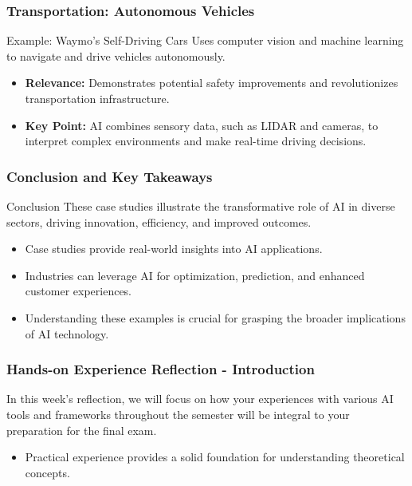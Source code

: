\documentclass{beamer}
\begin{document}
\begin{frame}[fragile]
    \frametitle{Transportation: Autonomous Vehicles}
    \begin{block}{Example: Waymo's Self-Driving Cars}
        Uses computer vision and machine learning to navigate and drive vehicles autonomously.
    \end{block}
    \begin{itemize}
        \item \textbf{Relevance:} Demonstrates potential safety improvements and revolutionizes transportation infrastructure.
        \item \textbf{Key Point:} AI combines sensory data, such as LIDAR and cameras, to interpret complex environments and make real-time driving decisions.
    \end{itemize}
\end{frame}

\begin{frame}[fragile]
    \frametitle{Conclusion and Key Takeaways}
    \begin{block}{Conclusion}
        These case studies illustrate the transformative role of AI in diverse sectors, driving innovation, efficiency, and improved outcomes.
    \end{block}
    \begin{itemize}
        \item Case studies provide real-world insights into AI applications.
        \item Industries can leverage AI for optimization, prediction, and enhanced customer experiences.
        \item Understanding these examples is crucial for grasping the broader implications of AI technology.
    \end{itemize}
\end{frame}

\begin{frame}[fragile]
    \frametitle{Hands-on Experience Reflection - Introduction}
    In this week's reflection, we will focus on how your experiences with various AI tools and frameworks throughout the semester will be integral to your preparation for the final exam. 
    \begin{itemize}
        \item Practical experience provides a solid foundation for understanding theoretical concepts.
    \end{itemize}
\end{frame}
\end{document}
